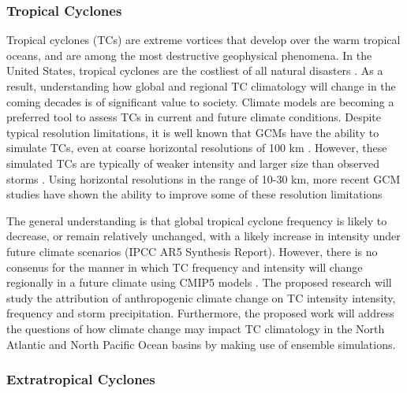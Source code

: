\documentclass[11pt]{article}
\begin{document}
\subsubsection{Tropical Cyclones}
Tropical cyclones (TCs) are extreme vortices that develop over the warm tropical oceans, and are among the most destructive geophysical phenomena. In the United States, tropical cyclones are the costliest of all natural disasters \citep{Pielke1998}. As a result, understanding how global and regional TC climatology will change in the coming decades is of significant value to society. Climate models are becoming a preferred tool to assess TCs in current and future climate conditions. Despite typical resolution limitations, it is well known that GCMs have the ability to simulate TCs, even at coarse horizontal resolutions of 100 km \citep{Knutson2010}. However, these simulated TCs are typically of weaker intensity and larger size than observed storms \citep{Walsh2007}. Using horizontal resolutions in the range of 10-30 km, more recent GCM studies have shown the ability to improve some of these resolution limitations \citep{Murakami2012,Manganello2012, Bacmeister2014, Wehner2014}

The general understanding is that global tropical cyclone frequency is likely to decrease, or remain relatively unchanged, with a likely increase in intensity under future climate scenarios (IPCC AR5 Synthesis Report). However, there is no consenus for the manner in which TC frequency and intensity will change regionally in a future climate using CMIP5 models \citep{Camargo2013}. The proposed research will study the attribution of anthropogenic climate change on TC intensity intensity, frequency and storm precipitation. Furthermore, the proposed work will address the questions of how climate change may impact TC climatology in the North Atlantic and North Pacific Ocean basins by making use of ensemble simulations.  

\subsubsection{Extratropical Cyclones}
\end{document}
